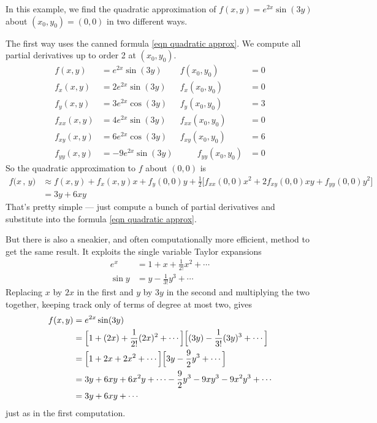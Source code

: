 \begin{eg}\label{eg approx D}
In this example, we find the quadratic approximation of 
$f(x,y)=e^{2x}\sin(3y)$ about $(x_0,y_0)=(0,0)$ in two different ways.

The first way uses the canned formula \eqref{eqn quadratic approx}.
We compute all partial derivatives up to order 2 at $(x_0,y_0)$.
\begin{align*}
f(x,y)&= e^{2x}\sin(3y) &
      f(x_0,y_0)&=0 \\
f_x(x,y)&= 2e^{2x}\sin(3y) &
      f_x(x_0,y_0)&=0 \\
f_y(x,y)&= 3e^{2x}\cos(3y) &
      f_y(x_0,y_0)&=3\\
f_{xx}(x,y)&=4e^{2x}\sin(3y) &
      f_{xx}(x_0,y_0)&=0\\
f_{xy}(x,y)&=6e^{2x}\cos(3y) &
      f_{xy}(x_0,y_0)&= 6\\
f_{yy}(x,y)&=-9e^{2x}\sin(3y) &\qquad
      f_{yy}(x_0,y_0)&=0 
\end{align*}
So the quadratic approximation to $f$ about $(0,0)$ is
\begin{align*}
f\big(x\,,\,y\big)
& \approx f(x, y)
        +f_x(x, y) x+f_y(0, 0)y %
+\frac{1}{2}\bigg[f_{xx}(0, 0)x^2
              +2f_{xy}(0, 0) x y
               +f_{yy}(0, 0) y^2\bigg] \\
&=3y+6xy
\end{align*}
That's pretty simple --- just compute a bunch of partial derivatives
and substitute into the formula \eqref{eqn quadratic approx}.

But there is also a sneakier, and often computationally more efficient,
method to get the same result. It exploits the single variable 
Taylor expansions
\begin{align*}
e^{x}&=1+x+\frac{1}{2!}x^2+\cdots\\
\sin y &=y - \frac{1}{3!}y^3+\cdots
\end{align*}
Replacing $x$ by $2x$ in the first and $y$ by $3y$ in the second
and multiplying the two together, keeping track only of terms of degree
at most two, gives
\begin{align*}
f(x,y)&= e^{2x}\sin(3y)\cr
&= \Big[1+(2x)+\frac{1}{2!}(2x)^2+\cdots\Big]
   \Big[(3y) - \frac{1}{3!}(3y)^3+\cdots\Big]\\
&= \Big[1+2x+2x^2+\cdots\Big]
   \Big[3y - \frac{9}{2}y^3+\cdots\Big]\\
&= 3y+6xy+6x^2y+\cdots
   - \frac{9}{2}y^3- 9xy^3- 9x^2y^3+\cdots \\
&=3y + 6xy + \cdots
\end{align*}
just as in the first computation.
\end{eg}

